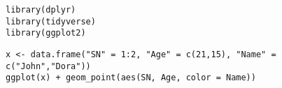 \documentclass[11pt]{article}
\author{DESKTOP-TS0M25G}
\date{\today}
\title{}
\begin{document}
\tableofcontents

\begin{verbatim}
library(dplyr)
library(tidyverse)
library(ggplot2)
\end{verbatim}


\begin{verbatim}
x <- data.frame("SN" = 1:2, "Age" = c(21,15), "Name" = c("John","Dora"))
ggplot(x) + geom_point(aes(SN, Age, color = Name))
\end{verbatim}
\end{document}
